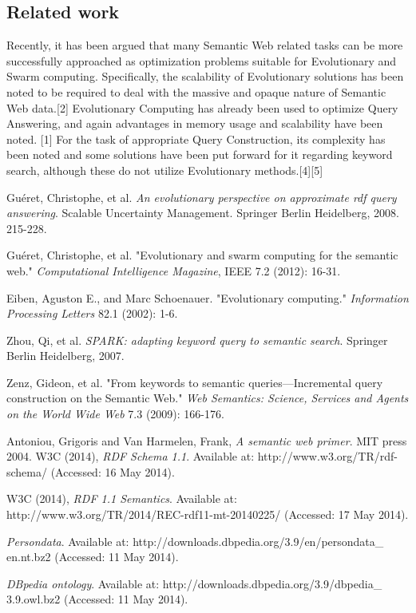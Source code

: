 \documentclass[thesis,12pt]{article}
\begin{document}
\subsection{Related work}
Recently, it has been argued that many Semantic Web related tasks can be more successfully approached as optimization problems suitable for Evolutionary and Swarm computing. Specifically, the scalability of Evolutionary solutions has been noted to be required to deal with the massive and opaque nature of Semantic Web data.[2] 
Evolutionary Computing has already been used to optimize Query Answering, and again advantages in memory usage and scalability have been noted. [1] For the task of appropriate Query Construction, its complexity has been noted and some solutions have been put forward for it regarding keyword search, although these do not utilize Evolutionary methods.[4][5]


\begin{thebibliography}{9}

Guéret, Christophe, et al. 
\emph{An evolutionary perspective on approximate rdf query answering}.   
 Scalable Uncertainty Management. Springer Berlin Heidelberg, 2008. 215-228.

Guéret, Christophe, et al. "Evolutionary and swarm computing for the semantic web." \emph{Computational Intelligence Magazine}, IEEE 7.2 (2012): 16-31.

Eiben, Aguston E., and Marc Schoenauer. "Evolutionary computing." 
\emph{Information Processing Letters} 82.1 (2002): 1-6.

Zhou, Qi, et al. \emph{SPARK: adapting keyword query to semantic search}. Springer Berlin Heidelberg, 2007.

Zenz, Gideon, et al. "From keywords to semantic queries—Incremental query construction on the Semantic Web." \emph{Web Semantics: Science, Services and Agents on the World Wide Web} 7.3 (2009): 166-176.

  Antoniou, Grigoris and Van Harmelen, Frank,
  \emph{A semantic web primer}.
  MIT press
  2004.
 W3C (2014), 
   \emph{RDF Schema 1.1}.
   Available at: http://www.w3.org/TR/rdf-schema/
   (Accessed: 16 May 2014).
   
W3C (2014), 
  \emph{RDF 1.1 Semantics}.
  Available at: http://www.w3.org/TR/2014/REC-rdf11-mt-20140225/
  (Accessed: 17 May 2014).

  \emph{Persondata}.
  Available at: http://downloads.dbpedia.org/3.9/en/persondata\_ en.nt.bz2
  (Accessed: 11 May 2014).

  \emph{DBpedia ontology}.
  Available at: http://downloads.dbpedia.org/3.9/dbpedia\_ 3.9.owl.bz2
  (Accessed: 11 May 2014).
  
\end{thebibliography}
\end{document}
